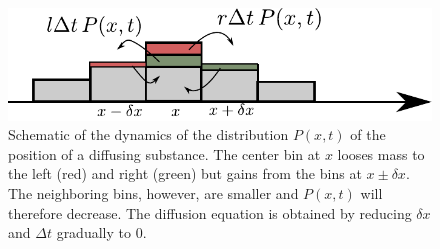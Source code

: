 \begin{figure}[tb]
	\centering
	\includegraphics[width=0.6\columnwidth]{figures/RW_masterEq}
	\caption{Schematic of the dynamics of the distribution $P(x,t)$ of the
	position of a diffusing substance. The center bin at $x$ looses mass to the left (red) and right (green) but gains from the bins at $x\pm \delta x$. The neighboring bins, however, are smaller and $P(x,t)$ will therefore decrease. The diffusion equation is obtained by reducing $\delta x$ and $\Delta t$ gradually to 0.}
	\label{fig:masterEQ}
\end{figure}


